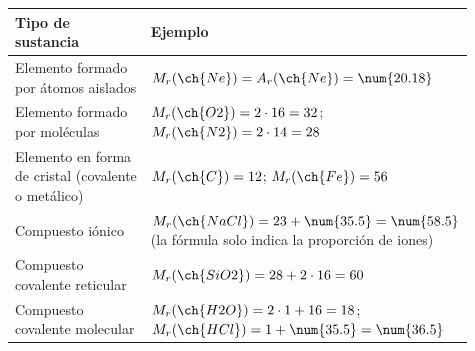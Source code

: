 \begin{center}
    \begin{tabular}{@{}L{0.39\linewidth} L{0.52\linewidth}@{}}
        \toprule
        \textbf{Tipo de sustancia} & \textbf{Ejemplo} \\
        \midrule
        Elemento formado por átomos aislados & \(M_r(\ch{Ne}) = A_r(\ch{Ne}) = \num{20.18}\) \\[3pt]
        Elemento formado por moléculas & \(M_r(\ch{O2}) = 2 \cdot 16 = 32\); \quad \(M_r(\ch{N2}) = 2 \cdot 14 = 28\) \\[3pt]
        Elemento en forma de cristal (covalente o metálico) & \(M_r(\ch{C}) = 12\); \quad \(M_r(\ch{Fe}) = 56\) \\[3pt]
        Compuesto iónico & \(M_r(\ch{NaCl}) = 23 + \num{35.5} = \num{58.5}\) (la fórmula solo indica la proporción de iones) \\[3pt]
        Compuesto covalente reticular & \(M_r(\ch{SiO2}) = 28 + 2 \cdot 16 = 60\) \\[3pt]
        Compuesto covalente molecular & \(M_r(\ch{H2O}) = 2 \cdot 1 + 16 = 18\); \quad \(M_r(\ch{HCl}) = 1 + \num{35.5} = \num{36.5}\) \\
        \bottomrule
    \end{tabular}
\end{center}

